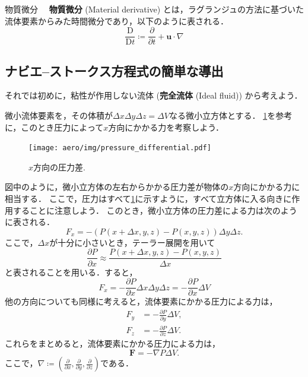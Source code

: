 \documentclass[uplatex,dvipdfmx,a4j,11pt]{jsreport}
\newcommand{\keyword}[1]{\textcolor{mainblue}{\textbf{#1}}}
\newcommand{\Diff}{\mathrm{D}} %
\numberwithin{equation}{chapter}
\begin{document}
\begin{definition}{物質微分}{}{}
  　\keyword{物質微分} (Material derivative) とは，ラグランジュの方法に基づいた流体要素からみた時間微分であり，以下のように表される．
    \begin{equation}
      \frac{\Diff}{\Diff t} \coloneqq \frac{\partial }{\partial t} + \mathbf{u}\cdot \nabla \label{eq:material_derivative}
    \end{equation}
\end{definition}

\subsection{ナビエ--ストークス方程式の簡単な導出}

それでは初めに，粘性が作用しない流体 (\keyword{完全流体} (Ideal fluid)) から考えよう．

微小流体要素を，その体積が$\Delta x \Delta y \Delta z = \Delta V$なる微小立方体とする．
\cref{fig:pressure_differential}を参考に，このとき圧力によって$x$方向にかかる力を考察しよう．

\begin{figure}[h]
  \centering
  \texttt{[image: aero/img/pressure\_differential.pdf]}
  \caption{$x$方向の圧力差.}
  \label{fig:pressure_differential}
\end{figure}

図中のように，微小立方体の左右からかかる圧力差が物体の$x$方向にかかる力に相当する．
ここで，圧力はすべて\cref{fig:pressure_differential}に示すように，すべて立方体に入る向きに作用することに注意しよう．
このとき，微小立方体の圧力差による力は次のように表される．
  \begin{equation}
    F_x = -\left(P(x + \Delta x, y, z) - P(x, y, z)\right) \Delta y \Delta z.
  \end{equation}
ここで，$\Delta x$が十分に小さいとき，テーラー展開を用いて
\begin{equation}
  \frac{\partial P}{\partial x} \approx \frac{P(x + \Delta x, y, z) - P(x, y, z)}{\Delta x}
\end{equation}
と表されることを用いる．すると，
\begin{equation}
  F_x = -\frac{\partial P}{\partial x} \Delta x\Delta y \Delta z = -\frac{\partial P}{\partial x} \Delta V
\end{equation}
他の方向についても同様に考えると，流体要素にかかる圧力による力は，
\begin{align*}
  F_y &= -\frac{\partial P}{\partial y} \Delta V, \\
  F_z &= -\frac{\partial P}{\partial z} \Delta V.
\end{align*}
これらをまとめると，流体要素にかかる圧力による力は，
\begin{equation}
  \mathbf{F} = -\nabla P \Delta V.
\end{equation}
ここで，$\nabla \coloneqq \left(\frac{\partial }{\partial x}, \frac{\partial }{\partial y}, \frac{\partial }{\partial z}\right)$である．
\end{document}
